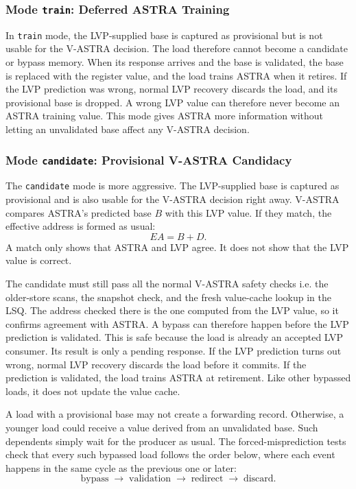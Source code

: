 \subsubsection{Mode \texttt{train}: Deferred ASTRA Training}

In \texttt{train} mode, the LVP-supplied base is captured as
provisional but is not usable for the V-ASTRA decision. The load
therefore cannot become a candidate or bypass memory. When its
response arrives and the base is validated, the base is replaced with
the register value, and the load trains ASTRA when it retires. If the
LVP prediction was wrong, normal LVP recovery discards the load, and
its provisional base is dropped. A wrong LVP value can therefore never
become an ASTRA training value. This mode gives ASTRA more
information without letting an unvalidated base affect any V-ASTRA
decision.

\subsubsection{Mode \texttt{candidate}: Provisional V-ASTRA Candidacy}

The \texttt{candidate} mode is more aggressive. The LVP-supplied base
is captured as provisional and is also usable for the V-ASTRA
decision right away. V-ASTRA compares ASTRA's predicted base \(B\)
with this LVP value. If they match, the effective address is formed
as usual:
\[
    EA = B + D.
\]
A match only shows that ASTRA and LVP agree. It does not show that
the LVP value is correct.

The candidate must still pass all the normal V-ASTRA safety checks i.e. the older-store scans, the snapshot check, and the fresh value-cache
lookup in the LSQ. The address checked there is the one computed from
the LVP value, so it confirms agreement with ASTRA. A bypass can therefore happen before the LVP prediction
is validated. This is safe because the load is already an accepted
LVP consumer. Its result is only a pending response. If the LVP
prediction turns out wrong, normal LVP recovery discards the load
before it commits. If the prediction is validated, the load trains
ASTRA at retirement. Like other bypassed loads, it does not update the
value cache.

A load with a provisional base may not create a forwarding record.
Otherwise, a younger load could receive a value derived from an
unvalidated base. Such dependents simply wait for the producer as
usual. The forced-misprediction tests check that every such bypassed load follows the order below, where each
event happens in the same cycle as the previous one or later:
\[
    \text{bypass}
    \;\rightarrow\;
    \text{validation}
    \;\rightarrow\;
    \text{redirect}
    \;\rightarrow\;
    \text{discard}.
\]

